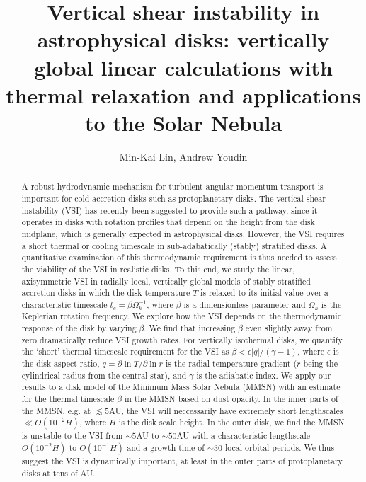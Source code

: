 \documentclass[iop]{emulateapj}
\newcommand{\p}{\partial}
\begin{document}
\title{Vertical shear instability in astrophysical disks: vertically global linear calculations with thermal relaxation and applications to the Solar Nebula} 
\author{Min-Kai Lin, Andrew Youdin}

\begin{abstract}
  A robust hydrodynamic mechanism for turbulent angular momentum
  transport is important for cold accretion disks such as 
  protoplanetary disks. The vertical shear instability (VSI) has 
  recently been suggested to provide such a pathway, since it operates in
  disks with rotation profiles that depend on the height from the 
  disk midplane, which is generally expected in  
  astrophysical disks. %
  However, the VSI requires a short thermal or cooling 
  timescale in sub-adabatically (stably) stratified disks.  
  A quantitative examination of this thermodynamic 
  requirement is thus needed to assess the viability of
  the VSI in realistic disks. To this end,  
  we study the linear, axisymmetric VSI in radially local, 
  vertically global models of stably stratified accretion disks in which the disk  
  temperature $T$ is relaxed to its initial value over a characteristic timescale 
  $t_c=\beta\Omega_k^{-1}$, where $\beta$ is a dimensionless parameter 
  and $\Omega_k$ is the Keplerian rotation frequency. We explore how
  the VSI depends on the thermodynamic response of the disk by
  varying $\beta$. We find that 
  increasing $\beta$ even slightly away from    
  zero dramatically reduce VSI growth rates. 
  For vertically isothermal disks, we quantify the
  `short' thermal timescale requirement for the VSI as $\beta < \epsilon|q|/(\gamma-1)$, where
  $\epsilon$ is the disk aspect-ratio, $q = \p\ln T/\p\ln r$  is the radial temperature gradient ($r$
  being the cylindrical radius from the central star), and 
  $\gamma$ is the adiabatic index. 
  We apply our results  
  to a disk model of the Minimum Mass Solar Nebula (MMSN) with an  
  estimate for the thermal timescale $\beta$ in the MMSN based on dust
  opacity. In the inner parts of the MMSN, e.g. at $\lesssim 5$AU, 
  the VSI will neccessarily have extremely short lengthscales $\ll 
  O(10^{-2}H)$, where $H$ is the disk scale height. In the outer disk, 
  we find the MMSN is unstable to the VSI from $\sim 5$AU to $\sim
  50$AU with a characteristic lengthscale $O(10^{-2}H)$ to
  $O(10^{-1}H)$ and a growth time of $\sim 30$ local orbital periods.  
  We thus suggest the VSI is dynamically important, at least in the 
  outer parts of protoplanetary disks at tens of AU. 
\end{abstract}
\end{document}
